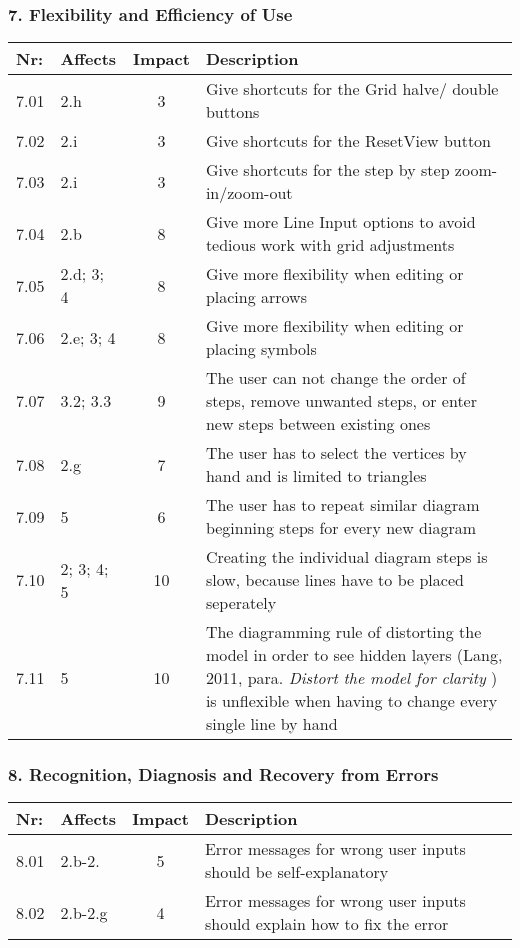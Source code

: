 \subsubsection*{7. Flexibility and Efficiency of Use}
        \begin{tabular}{l | p{} | c | p{}}
        Nr: & Affects & Impact & Description \\ \hline
        7.01 & 2.h & 3 & Give shortcuts for the Grid halve/ double buttons\\ \hline
        7.02 & 2.i  & 3 & Give shortcuts for the ResetView button\\ \hline
        7.03 & 2.i & 3 & Give shortcuts for the step by step zoom-in/zoom-out\\ \hline
        7.04 & 2.b & 8 & Give more Line Input options to avoid tedious work with grid adjustments\\ \hline
        7.05 & 2.d; 3; 4 & 8 & Give more flexibility when editing or placing arrows\\ \hline
        7.06 & 2.e; 3; 4 & 8 & Give more flexibility when editing or placing symbols\\ \hline
        7.07 & 3.2; 3.3 & 9 & The user can not change the order of steps, remove unwanted steps, or enter new steps between existing ones\\ \hline
        7.08 & 2.g & 7 & The user has to select the vertices by hand and is limited to triangles\\ \hline
        7.09 & 5 & 6 & The user has to repeat similar diagram beginning steps for every new diagram\\ \hline
        7.10 & 2; 3; 4; 5 & 10 & Creating the individual diagram steps is slow, because lines have to be placed seperately\\ \hline
        7.11 & 5 & 10 & The diagramming rule of distorting the model in order to see hidden layers (Lang, 2011, para. \emph{Distort the model for clarity} \cite{Lang}) is unflexible when having to change every single line by hand\\ \hline
        \end{tabular}

\subsubsection*{8. Recognition, Diagnosis and Recovery from Errors}
        \begin{tabular}{l | p{} | c | p{}}
        Nr: & Affects & Impact & Description \\ \hline
        8.01 & 2.b-2. & 5 & Error messages for wrong user inputs should be self-explanatory\\ \hline
        8.02 & 2.b-2.g & 4 & Error messages for wrong user inputs should explain how to fix the error\\ \hline
        \end{tabular}


